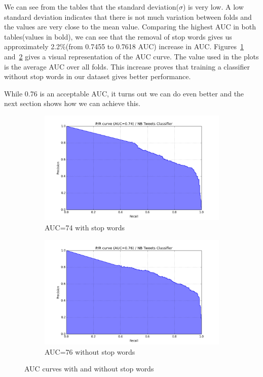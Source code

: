 We can see from the tables that the standard deviation($\sigma$) is very low. A low standard
deviation indicates that there is not much variation between folds and the values are very close to
the mean value. Comparing the highest AUC in both tables(values in bold), we can see that the
removal of stop words gives us approximately 2.2\%(from 0.7455 to 0.7618 AUC) increase in AUC\@.
Figures~\ref{fig:auc-with-stopwords} and~\ref{fig:auc-without-stopwords} gives a visual
representation of the AUC curve. The value used in the plots is the average AUC over all folds.
This increase proves that training a classifier without stop words in our dataset gives better
performance.

While 0.76 is an acceptable AUC, it turns out we can do even better and the next section shows how
we can achieve this.

\begin{figure}
  \centering
  \begin{subfigure}[b]{0.49\linewidth}
    \includegraphics[width=\linewidth]{Figures/pr_NB_Tweets_Classifier_01}
  \caption{AUC=74 with stop words}
  \label{fig:auc-with-stopwords}
  \end{subfigure}
  \begin{subfigure}[b]{0.49\linewidth}
      \includegraphics[width=\linewidth]{Figures/pr_NB_Tweets_Classifier_02}
  \caption{AUC=76 without stop words}
  \label{fig:auc-without-stopwords}
  \end{subfigure}
\caption{AUC curves with and without stop words}
\label{fig:auc-curves-stopwords}
\end{figure}



